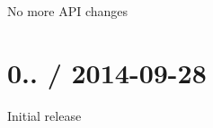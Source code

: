 
\begin{DoxyItemize}
\item No more A\+PI changes
\end{DoxyItemize}

\section*{0.. / 2014-\/09-\/28 }


\begin{DoxyItemize}
\item Initial release 
\end{DoxyItemize}